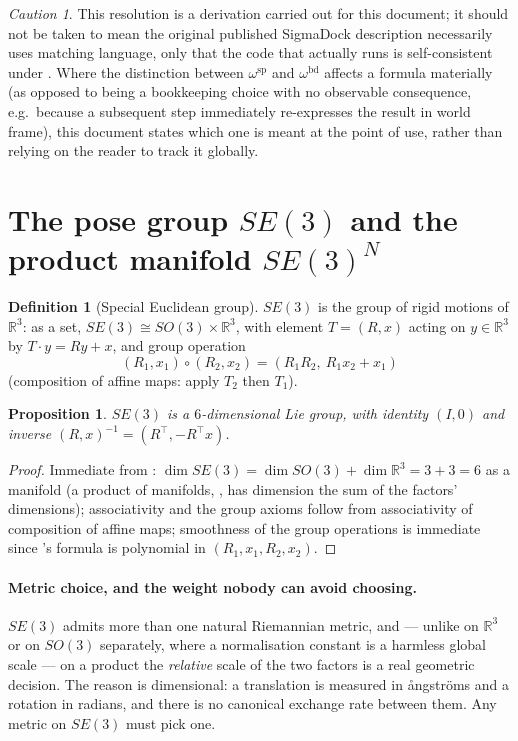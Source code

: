 \documentclass[11pt,a4paper]{report}
\newtheorem{proposition}[proposition]{Proposition}
\theoremstyle{definition}
\newtheorem{definition}[definition]{Definition}
\theoremstyle{remark}
\newtheorem{caution}[caution]{Caution}
\newcommand{\RR}{\mathbb R}
\begin{document}
\begin{caution}
This resolution is a derivation carried out for this document; it should
not be taken to mean the original published SigmaDock description
necessarily uses matching language, only that the code that actually runs
is self-consistent under . Where the
distinction between $\omega^{\mathrm{sp}}$ and $\omega^{\mathrm{bd}}$ affects a
formula materially (as opposed to being a bookkeeping choice with no
observable consequence, e.g.\ because a subsequent step immediately
re-expresses the result in world frame), this document states which one is
meant at the point of use, rather than relying on the reader to track it
globally.
\end{caution}

\section{The pose group $SE(3)$ and the product manifold $SE(3)^N$}
\label{sec:se3-scratch}

\begin{definition}[Special Euclidean group]
\label{def:se3-scratch}
$SE(3)$ is the group of rigid motions of $\RR^3$: as a set,
$SE(3) \cong SO(3)\times\RR^3$, with element $T=(R,x)$ acting on $y\in\RR^3$
by $T\cdot y = Ry+x$, and group operation
\[
(R_1,x_1)\circ(R_2,x_2) = (R_1R_2,\ R_1x_2+x_1)
\]
(composition of affine maps: apply $T_2$ then $T_1$).
\end{definition}

\begin{proposition}
$SE(3)$ is a $6$-dimensional Lie group, with identity $(I,0)$ and inverse
$(R,x)^{-1}=(R^\top,-R^\top x)$.
\end{proposition}

\begin{proof}
Immediate from : $\dim SE(3)=\dim SO(3)+\dim\RR^3=3+3=6$
as a manifold (a product of manifolds, , has
dimension the sum of the factors' dimensions); associativity and the group
axioms follow from associativity of composition of affine maps; smoothness
of the group operations is immediate since 's formula
is polynomial in $(R_1,x_1,R_2,x_2)$.
\end{proof}

\paragraph{Metric choice, and the weight nobody can avoid choosing.}
$SE(3)$ admits more than one natural Riemannian metric, and --- unlike on
$\RR^3$ or on $SO(3)$ separately, where a normalisation constant is a
harmless global scale --- on a product the \emph{relative} scale of the two
factors is a real geometric decision. The reason is dimensional: a
translation is measured in \r{a}ngstr\"oms and a rotation in radians, and
there is no canonical exchange rate between them. Any metric on $SE(3)$ must
pick one.
\end{document}
